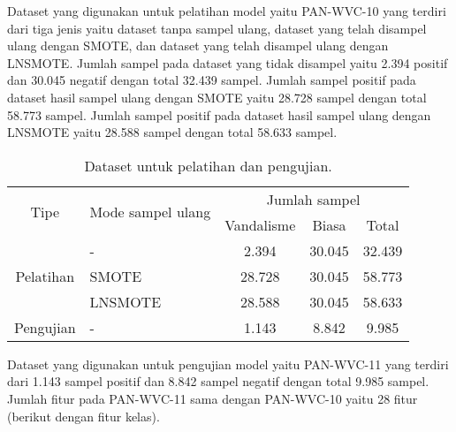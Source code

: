 Dataset yang digunakan untuk pelatihan model yaitu PAN-WVC-10 yang terdiri dari
tiga jenis yaitu dataset tanpa sampel ulang, dataset yang telah disampel ulang
dengan SMOTE, dan dataset yang telah disampel ulang dengan LNSMOTE.
Jumlah sampel pada dataset yang tidak disampel yaitu 2.394 positif dan 30.045
negatif dengan total 32.439 sampel.
Jumlah sampel positif pada dataset hasil sampel ulang dengan SMOTE yaitu 28.728
sampel dengan total 58.773 sampel.
Jumlah sampel positif pada dataset hasil sampel ulang dengan LNSMOTE yaitu
28.588 sampel dengan total 58.633 sampel.

\begin{table}[!ht]
\centering
\caption{Dataset untuk pelatihan dan pengujian.}
\begin{tabular}{|| c | l | c | c | c ||}
\hline
\multirow{2}{*}{Tipe} & \multirow{2}{*}{Mode sampel ulang} & \multicolumn{3}{c||}{Jumlah sampel} \\
\cline{3-5}
                         &                                       & Vandalisme & Biasa & Total \\
\hline
\hline
\multirow{3}{*}{Pelatihan} & -       &  2.394 & 30.045 & 32.439 \\
                              & SMOTE   & 28.728 & 30.045 & 58.773 \\
                              & LNSMOTE & 28.588 & 30.045 & 58.633 \\
\hline
Pengujian & - & 1.143 & 8.842 & 9.985 \\
\hline
\end{tabular}
\label{table:dataset}
\end{table}

Dataset yang digunakan untuk pengujian model yaitu PAN-WVC-11 yang terdiri dari
1.143 sampel positif dan 8.842 sampel negatif dengan total 9.985 sampel.
Jumlah fitur pada PAN-WVC-11 sama dengan PAN-WVC-10 yaitu 28 fitur (berikut
dengan fitur kelas).
